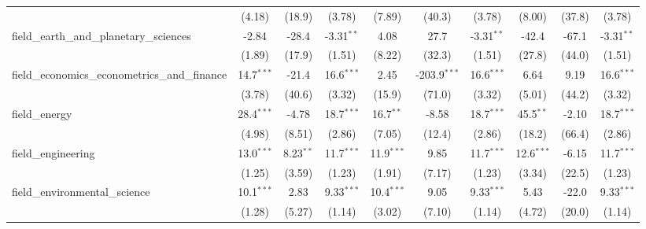 \begin{tabular}{lccccccccc}
                                                               & (4.18)        & (18.9)        & (3.78)        & (7.89)         & (40.3)         & (3.78)        & (8.00)        & (37.8)        & (3.78)\\   
   field\_earth\_and\_planetary\_sciences                      & -2.84         & -28.4         & -3.31$^{**}$  & 4.08           & 27.7           & -3.31$^{**}$  & -42.4         & -67.1         & -3.31$^{**}$\\   
                                                               & (1.89)        & (17.9)        & (1.51)        & (8.22)         & (32.3)         & (1.51)        & (27.8)        & (44.0)        & (1.51)\\   
   field\_economics\_econometrics\_and\_finance                & 14.7$^{***}$  & -21.4         & 16.6$^{***}$  & 2.45           & -203.9$^{***}$ & 16.6$^{***}$  & 6.64          & 9.19          & 16.6$^{***}$\\   
                                                               & (3.78)        & (40.6)        & (3.32)        & (15.9)         & (71.0)         & (3.32)        & (5.01)        & (44.2)        & (3.32)\\   
   field\_energy                                               & 28.4$^{***}$  & -4.78         & 18.7$^{***}$  & 16.7$^{**}$    & -8.58          & 18.7$^{***}$  & 45.5$^{**}$   & -2.10         & 18.7$^{***}$\\   
                                                               & (4.98)        & (8.51)        & (2.86)        & (7.05)         & (12.4)         & (2.86)        & (18.2)        & (66.4)        & (2.86)\\   
   field\_engineering                                          & 13.0$^{***}$  & 8.23$^{**}$   & 11.7$^{***}$  & 11.9$^{***}$   & 9.85           & 11.7$^{***}$  & 12.6$^{***}$  & -6.15         & 11.7$^{***}$\\   
                                                               & (1.25)        & (3.59)        & (1.23)        & (1.91)         & (7.17)         & (1.23)        & (3.34)        & (22.5)        & (1.23)\\   
   field\_environmental\_science                               & 10.1$^{***}$  & 2.83          & 9.33$^{***}$  & 10.4$^{***}$   & 9.05           & 9.33$^{***}$  & 5.43          & -22.0         & 9.33$^{***}$\\   
                                                               & (1.28)        & (5.27)        & (1.14)        & (3.02)         & (7.10)         & (1.14)        & (4.72)        & (20.0)        & (1.14)\\   

\end{tabular}
